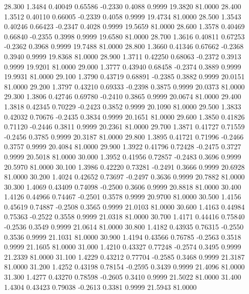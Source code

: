   28.300   1.3484   0.40049   0.65586  -0.2330   0.4088   0.9999  19.3820  81.0000
  28.400   1.3512   0.40110   0.66005  -0.2339   0.4058   0.9999  19.4734  81.0000
  28.500   1.3543   0.40246   0.66423  -0.2347   0.4028   0.9999  19.5659  81.0000
  28.600   1.3578   0.40469   0.66840  -0.2355   0.3998   0.9999  19.6580  81.0000
  28.700   1.3616   0.40811   0.67253  -0.2362   0.3968   0.9999  19.7488  81.0000
  28.800   1.3660   0.41346   0.67662  -0.2368   0.3940   0.9999  19.8368  81.0000
  28.900   1.3711   0.42250   0.68063  -0.2372   0.3913   0.9999  19.9201  81.0000
  29.000   1.3777   0.43940   0.68458  -0.2374   0.3889   0.9999  19.9931  81.0000
  29.100   1.3790   0.43719   0.68891  -0.2385   0.3882   0.9999  20.0151  81.0000
  29.200   1.3797   0.43210   0.69333  -0.2398   0.3875   0.9999  20.0373  81.0000
  29.300   1.3806   0.42746   0.69780  -0.2410   0.3865   0.9999  20.0674  81.0000
  29.400   1.3818   0.42345   0.70229  -0.2423   0.3852   0.9999  20.1090  81.0000
  29.500   1.3833   0.42032   0.70676  -0.2435   0.3834   0.9999  20.1651  81.0000
  29.600   1.3850   0.41826   0.71120  -0.2446   0.3811   0.9999  20.2361  81.0000
  29.700   1.3871   0.41727   0.71559  -0.2456   0.3785   0.9999  20.3187  81.0000
  29.800   1.3895   0.41721   0.71996  -0.2466   0.3757   0.9999  20.4084  81.0000
  29.900   1.3922   0.41796   0.72428  -0.2475   0.3727   0.9999  20.5018  81.0000
  30.000   1.3952   0.41956   0.72857  -0.2483   0.3696   0.9999  20.5970  81.0000
  30.100   1.3986   0.42220   0.73281  -0.2491   0.3666   0.9999  20.6928  81.0000
  30.200   1.4024   0.42652   0.73697  -0.2497   0.3636   0.9999  20.7882  81.0000
  30.300   1.4069   0.43409   0.74098  -0.2500   0.3606   0.9999  20.8818  81.0000
  30.400   1.4126   0.44966   0.74467  -0.2501   0.3578   0.9999  20.9700  81.0000
  30.500   1.4156   0.45619   0.74887  -0.2508   0.3565   0.9999  21.0103  81.0000
  30.600   1.4163   0.44984   0.75363  -0.2522   0.3558   0.9999  21.0318  81.0000
  30.700   1.4171   0.44416   0.75840  -0.2536   0.3549   0.9999  21.0614  81.0000
  30.800   1.4182   0.43935   0.76315  -0.2550   0.3536   0.9999  21.1031  81.0000
  30.900   1.4194   0.43566   0.76785  -0.2563   0.3518   0.9999  21.1605  81.0000
  31.000   1.4210   0.43327   0.77248  -0.2574   0.3495   0.9999  21.2339  81.0000
  31.100   1.4229   0.43212   0.77704  -0.2585   0.3468   0.9999  21.3187  81.0000
  31.200   1.4252   0.43198   0.78154  -0.2595   0.3439   0.9999  21.4096  81.0000
  31.300   1.4277   0.43270   0.78598  -0.2605   0.3410   0.9999  21.5022  81.0000
  31.400   1.4304   0.43423   0.79038  -0.2613   0.3381   0.9999  21.5943  81.0000
